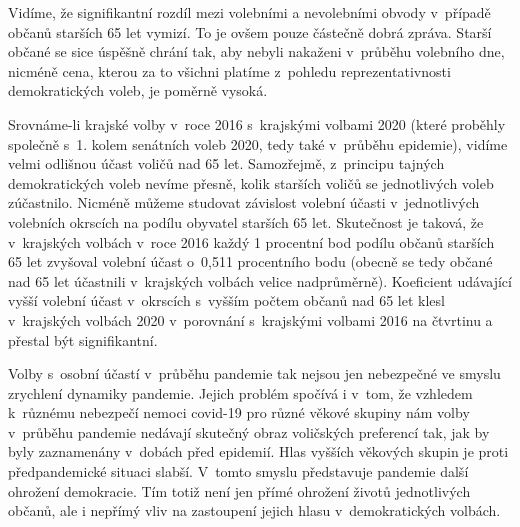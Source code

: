 Vidíme, že signifikantní rozdíl mezi volebními a nevolebními obvody v~případě občanů starších 65 let vymizí. To je ovšem pouze částečně dobrá zpráva. Starší občané se sice úspěšně chrání tak, aby nebyli nakaženi v~průběhu volebního dne, nicméně cena, kterou za to všichni platíme z~pohledu reprezentativnosti demokratických voleb, je poměrně vysoká. 

Srovnáme-li krajské volby v~roce 2016 s~krajskými volbami 2020 (které proběhly společně s~1. kolem senátních voleb 2020, tedy také v~průběhu epidemie), vidíme velmi odlišnou účast voličů nad 65 let. Samozřejmě, z~principu tajných demokratických voleb nevíme přesně, kolik starších voličů se jednotlivých voleb zúčastnilo. Nicméně můžeme studovat závislost volební účasti v~jednotlivých volebních okrscích na podílu obyvatel starších 65 let. Skutečnost je taková, že v~krajských volbách v~roce 2016 každý 1 procentní bod podílu občanů starších 65 let zvyšoval volební účast o~0,511 procentního bodu (obecně se tedy občané nad 65 let účastnili v~krajských volbách velice nadprůměrně). Koeficient udávající vyšší volební účast v~okrscích s~vyšším počtem občanů nad 65 let klesl v~krajských volbách 2020 v~porovnání s~krajskými volbami 2016 na čtvrtinu a přestal být signifikantní.

Volby s~osobní účastí v~průběhu pandemie tak nejsou jen nebezpečné ve smyslu zrychlení dynamiky pandemie. Jejich problém spočívá i v~tom, že vzhledem k~růz\-né\-mu nebezpečí nemoci covid-19 pro různé věkové skupiny nám volby v~průběhu pandemie nedávají skutečný obraz voličských preferencí tak, jak by byly zaznamenány v~dobách před epidemií. Hlas vyšších věkových skupin je proti předpandemické situaci slabší. V~tomto smyslu představuje pandemie další ohrožení demokracie. Tím totiž není jen přímé ohrožení životů jednotlivých občanů, ale i nepřímý vliv na zastoupení jejich hlasu v~demokratických volbách.

